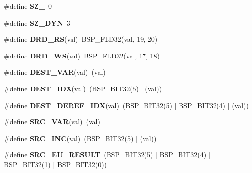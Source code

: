 \begin{DoxyCompactItemize}
\#define {\bfseries S\+Z\+\_}~0
\item 
\mbox{\label{group__BestCommOps_ga53575003a39c93a033fc78fc68e0a08d}} 
\#define {\bfseries S\+Z\+\_\+\+D\+YN}~3
\item 
\mbox{\label{group__BestCommOps_gad387463ecbebd3f3127dfd20efb82d5d}} 
\#define {\bfseries D\+R\+D\+\_\+\+RS}(val)~B\+S\+P\+\_\+\+F\+L\+D32(val, 19, 20)
\item 
\mbox{\label{group__BestCommOps_ga5bc1b7eca720286476ec3267bd8a872f}} 
\#define {\bfseries D\+R\+D\+\_\+\+WS}(val)~B\+S\+P\+\_\+\+F\+L\+D32(val, 17, 18)
\item 
\mbox{\label{group__BestCommOps_ga1654367118f309ad749c5315979c7335}} 
\#define {\bfseries D\+E\+S\+T\+\_\+\+V\+AR}(val)~(val)
\item 
\mbox{\label{group__BestCommOps_ga239663e594d2e6108cf7781aa6dcb4d0}} 
\#define {\bfseries D\+E\+S\+T\+\_\+\+I\+DX}(val)~(B\+S\+P\+\_\+\+B\+I\+T32(5) $\vert$ (val))
\item 
\mbox{\label{group__BestCommOps_gad54aa1962b9589fb4bfe457c210968d4}} 
\#define {\bfseries D\+E\+S\+T\+\_\+\+D\+E\+R\+E\+F\+\_\+\+I\+DX}(val)~(B\+S\+P\+\_\+\+B\+I\+T32(5) $\vert$ B\+S\+P\+\_\+\+B\+I\+T32(4) $\vert$ (val))
\item 
\mbox{\label{group__BestCommOps_ga2682ddaec512cff7cb5bfdd4f8b15548}} 
\#define {\bfseries S\+R\+C\+\_\+\+V\+AR}(val)~(val)
\item 
\mbox{\label{group__BestCommOps_ga8369f47618f09a34355a3ed5269cd2cf}} 
\#define {\bfseries S\+R\+C\+\_\+\+I\+NC}(val)~(B\+S\+P\+\_\+\+B\+I\+T32(5) $\vert$ (val))
\item 
\mbox{\label{group__BestCommOps_ga59caca33b82122795d5ed35bbc5aabf3}} 
\#define {\bfseries S\+R\+C\+\_\+\+E\+U\+\_\+\+R\+E\+S\+U\+LT}~(B\+S\+P\+\_\+\+B\+I\+T32(5) $\vert$ B\+S\+P\+\_\+\+B\+I\+T32(4) $\vert$ B\+S\+P\+\_\+\+B\+I\+T32(1) $\vert$ B\+S\+P\+\_\+\+B\+I\+T32(0))
\item 
\mbox{\label{group__BestCommOps_gab2b8dee09110391459c7b09cea3820aa}} 

\end{DoxyCompactItemize}
